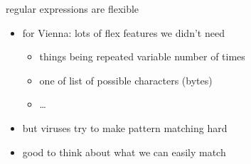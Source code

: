 \begin{frame}{regular expressions are flexible}
    \begin{itemize}
    \item for Vienna: lots of flex features we didn't need
        \begin{itemize}
        \item things being repeated variable number of times
        \item one of list of possible characters (bytes)
        \item \ldots
        \end{itemize}
    \vspace{.5cm}
    \item but viruses try to make pattern matching hard
    \item good to think about what we can easily match
    \end{itemize}
\end{frame}
